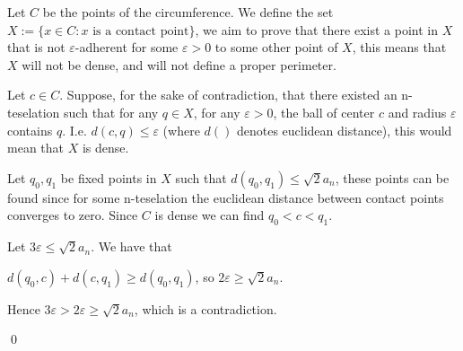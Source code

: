 \documentclass{article}
\theoremstyle{remark}
\begin{document}
\begin{enumerate}
        Let $C$ be the points of the circumference.
        We define the set $X := \{x \in C: x \text{ is a contact point}\}$, we aim to prove that there exist a point in $X$ that is not $\varepsilon$-adherent for some $\varepsilon > 0$ to some other point of $X$,
        this means that $X$ will not be dense, and will not define a proper perimeter.

        Let $c \in C$. Suppose, for the sake of contradiction, that there existed an n-teselation such that for any $q \in X$, for any $\varepsilon > 0$, the ball of center $c$ and radius $\varepsilon$ contains 
        $q$. I.e. $d(c,q) \leq \varepsilon$ (where $d()$ denotes euclidean distance), this would mean that $X$ is dense.
        
        Let $q_0, q_1$ be fixed points in $X$ such that $d(q_0,q_1) \leq \sqrt{2}a_n$, these points can be found since 
        for some n-teselation the euclidean distance between contact points converges to zero.
        Since $C$ is dense we can find $q_0 < c < q_1$.

        Let $3\varepsilon \leq \sqrt{2}a_n$. We have that 
        \begin{center}
            $\displaystyle d(q_0, c) + d(c, q_1) \geq d(q_0, q_1)$, so $\displaystyle 2\varepsilon \geq \sqrt{2}a_n$.
        \end{center}
        Hence $\displaystyle 3\varepsilon > 2\varepsilon \geq \sqrt{2}a_n$, which is a contradiction.
        \begin{flushright}
            \qed
        \end{flushright}
    \end{enumerate}
\end{document}
